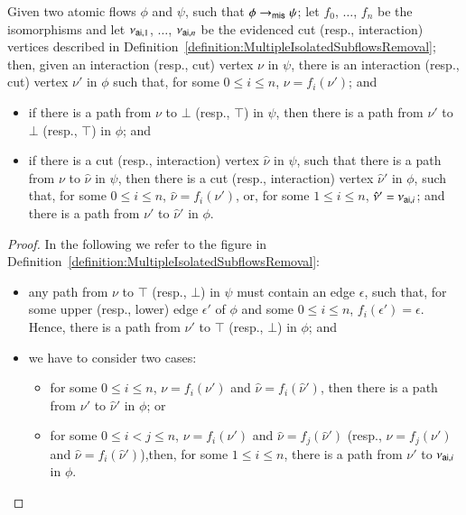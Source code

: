 
\begin{lemma}\label{lemma:MultipleIsolatedSubflowsRemovalPaths}
Given two atomic flows $\phi$ and $\psi$, such that $\phi\to_{\mathsf{mis}}\psi$; let $f_0$, $\dots$, $f_n$ be the isomorphisms and let $\nu_{\mathsf{ai},1}$, $\dots$, $\nu_{\mathsf{ai},n}$ be the evidenced cut (resp., interaction) vertices described in Definition~\ref{definition:MultipleIsolatedSubflowsRemoval}; then, given an interaction (resp., cut) vertex $\nu$ in $\psi$, there is an interaction (resp., cut) vertex $\nu'$ in $\phi$ such that, for some $0\le i\le n$, $\nu=f_i(\nu')$; and
\begin{itemize}
\item if there is a path from $\nu$ to $\bot$ (resp., $\top$) in $\psi$, then there is a path from $\nu'$ to $\bot$ (resp., $\top$) in $\phi$; and
\item if there is a cut (resp., interaction) vertex $\hat\nu$ in $\psi$, such that there is a path from $\nu$ to $\hat\nu$ in $\psi$, then there is a cut (resp., interaction) vertex $\hat\nu'$ in $\phi$, such that, for some $0\le i\le n$, $\hat\nu=f_i(\nu')$, or, for some $1\le i\le n$, $\hat\nu'=\nu_{\mathsf{ai},i}$; and there is a path from $\nu'$ to $\hat\nu'$ in $\phi$.
\end{itemize}
\end{lemma}

\begin{proof}
In the following we refer to the figure in Definition~\ref{definition:MultipleIsolatedSubflowsRemoval}:
\begin{itemize}
 \item any path from $\nu$ to $\top$ (resp., $\bot$) in $\psi$ must contain an edge $\epsilon$, such that, for some upper (resp., lower) edge $\epsilon'$ of $\phi$ and some $0\le i\le n$, $f_i(\epsilon')=\epsilon$. Hence, there is a path from $\nu'$ to $\top$ (resp., $\bot$) in $\phi$; and
 \item we have to consider two cases:
 \begin{itemize}
  \item for some $0\le i\le n$, $\nu=f_i(\nu')$ and $\hat\nu=f_i(\hat\nu')$, then there is a path from $\nu'$ to $\hat\nu'$ in $\phi$; or
  \item for some $0\le i<j\le n$, $\nu=f_i(\nu')$ and $\hat\nu=f_j(\hat\nu')$ (resp., $\nu=f_j(\nu')$ and $\hat\nu=f_i(\hat\nu')$),then, for some $1\le i\le n$, there is a path from $\nu'$ to $\nu_{\mathsf{ai},i}$ in $\phi$.
 \end{itemize}
\end{itemize}
\end{proof}

